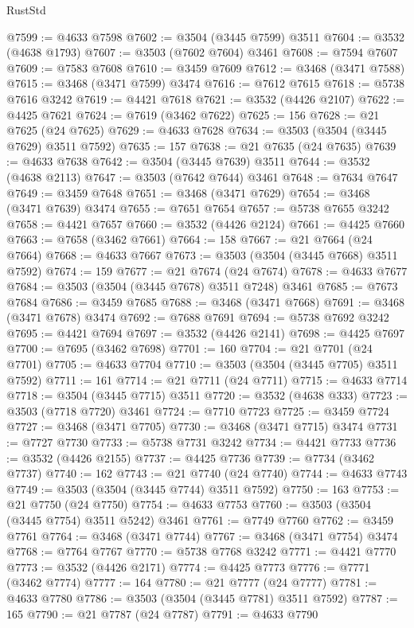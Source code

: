 \begin{lexlean}{RustStd}
\begin{coremodule}
@7599 := @4633 @7598
@7602 := @3504 (@3445 @7599) @3511
@7604 := @3532 (@4638 @1793)
@7607 := @3503 (@7602 @7604) @3461
@7608 := @7594 @7607
@7609 := @7583 @7608
@7610 := @3459 @7609
@7612 := @3468 (@3471 @7588)
@7615 := @3468 (@3471 @7599) @3474
@7616 := @7612 @7615
@7618 := @5738 @7616 @3242
@7619 := @4421 @7618
@7621 := @3532 (@4426 @2107)
@7622 := @4425 @7621
@7624 := @7619 (@3462 @7622)
@7625 := 156
@7628 := @21 @7625 (@24 @7625)
@7629 := @4633 @7628
@7634 := @3503 (@3504 (@3445 @7629) @3511 @7592)
@7635 := 157
@7638 := @21 @7635 (@24 @7635)
@7639 := @4633 @7638
@7642 := @3504 (@3445 @7639) @3511
@7644 := @3532 (@4638 @2113)
@7647 := @3503 (@7642 @7644) @3461
@7648 := @7634 @7647
@7649 := @3459 @7648
@7651 := @3468 (@3471 @7629)
@7654 := @3468 (@3471 @7639) @3474
@7655 := @7651 @7654
@7657 := @5738 @7655 @3242
@7658 := @4421 @7657
@7660 := @3532 (@4426 @2124)
@7661 := @4425 @7660
@7663 := @7658 (@3462 @7661)
@7664 := 158
@7667 := @21 @7664 (@24 @7664)
@7668 := @4633 @7667
@7673 := @3503 (@3504 (@3445 @7668) @3511 @7592)
@7674 := 159
@7677 := @21 @7674 (@24 @7674)
@7678 := @4633 @7677
@7684 := @3503 (@3504 (@3445 @7678) @3511 @7248) @3461
@7685 := @7673 @7684
@7686 := @3459 @7685
@7688 := @3468 (@3471 @7668)
@7691 := @3468 (@3471 @7678) @3474
@7692 := @7688 @7691
@7694 := @5738 @7692 @3242
@7695 := @4421 @7694
@7697 := @3532 (@4426 @2141)
@7698 := @4425 @7697
@7700 := @7695 (@3462 @7698)
@7701 := 160
@7704 := @21 @7701 (@24 @7701)
@7705 := @4633 @7704
@7710 := @3503 (@3504 (@3445 @7705) @3511 @7592)
@7711 := 161
@7714 := @21 @7711 (@24 @7711)
@7715 := @4633 @7714
@7718 := @3504 (@3445 @7715) @3511
@7720 := @3532 (@4638 @333)
@7723 := @3503 (@7718 @7720) @3461
@7724 := @7710 @7723
@7725 := @3459 @7724
@7727 := @3468 (@3471 @7705)
@7730 := @3468 (@3471 @7715) @3474
@7731 := @7727 @7730
@7733 := @5738 @7731 @3242
@7734 := @4421 @7733
@7736 := @3532 (@4426 @2155)
@7737 := @4425 @7736
@7739 := @7734 (@3462 @7737)
@7740 := 162
@7743 := @21 @7740 (@24 @7740)
@7744 := @4633 @7743
@7749 := @3503 (@3504 (@3445 @7744) @3511 @7592)
@7750 := 163
@7753 := @21 @7750 (@24 @7750)
@7754 := @4633 @7753
@7760 := @3503 (@3504 (@3445 @7754) @3511 @5242) @3461
@7761 := @7749 @7760
@7762 := @3459 @7761
@7764 := @3468 (@3471 @7744)
@7767 := @3468 (@3471 @7754) @3474
@7768 := @7764 @7767
@7770 := @5738 @7768 @3242
@7771 := @4421 @7770
@7773 := @3532 (@4426 @2171)
@7774 := @4425 @7773
@7776 := @7771 (@3462 @7774)
@7777 := 164
@7780 := @21 @7777 (@24 @7777)
@7781 := @4633 @7780
@7786 := @3503 (@3504 (@3445 @7781) @3511 @7592)
@7787 := 165
@7790 := @21 @7787 (@24 @7787)
@7791 := @4633 @7790

\end{coremodule}
\end{lexlean}
